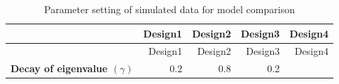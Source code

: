 \documentclass[12pt,A4paper,authoryear]{elsarticle} %
\theoremstyle{definition}
\theoremstyle{definition}
\theoremstyle{remark}
\begin{document}
\begin{longtable}[]{@{}rrrrr@{}}
\caption{\label{tab:parameter-settings} Parameter setting of simulated data
for model comparison}\tabularnewline
\toprule
\begin{minipage}[b]{0.36\columnwidth}\raggedleft\strut
~\strut
\end{minipage} & \begin{minipage}[b]{0.13\columnwidth}\raggedleft\strut
Design1\strut
\end{minipage} & \begin{minipage}[b]{0.13\columnwidth}\raggedleft\strut
Design2\strut
\end{minipage} & \begin{minipage}[b]{0.13\columnwidth}\raggedleft\strut
Design3\strut
\end{minipage} & \begin{minipage}[b]{0.13\columnwidth}\raggedleft\strut
Design4\strut
\end{minipage}\tabularnewline
\midrule
\endfirsthead
\toprule
\begin{minipage}[b]{0.36\columnwidth}\raggedleft\strut
~\strut
\end{minipage} & \begin{minipage}[b]{0.13\columnwidth}\raggedleft\strut
Design1\strut
\end{minipage} & \begin{minipage}[b]{0.13\columnwidth}\raggedleft\strut
Design2\strut
\end{minipage} & \begin{minipage}[b]{0.13\columnwidth}\raggedleft\strut
Design3\strut
\end{minipage} & \begin{minipage}[b]{0.13\columnwidth}\raggedleft\strut
Design4\strut
\end{minipage}\tabularnewline
\midrule
\endhead
\begin{minipage}[t]{0.36\columnwidth}\raggedleft\strut
\textbf{Decay of eigenvalue \((\gamma)\)}\strut
\end{minipage} & \begin{minipage}[t]{0.13\columnwidth}\raggedleft\strut
0.2\strut
\end{minipage} & \begin{minipage}[t]{0.13\columnwidth}\raggedleft\strut
0.8\strut
\end{minipage} & \begin{minipage}[t]{0.13\columnwidth}\raggedleft\strut
0.2\strut
\end{minipage} & \begin{minipage}[t]{0.13\columnwidth}\raggedleft\strut

\end{minipage}
\end{longtable}
\end{document}
